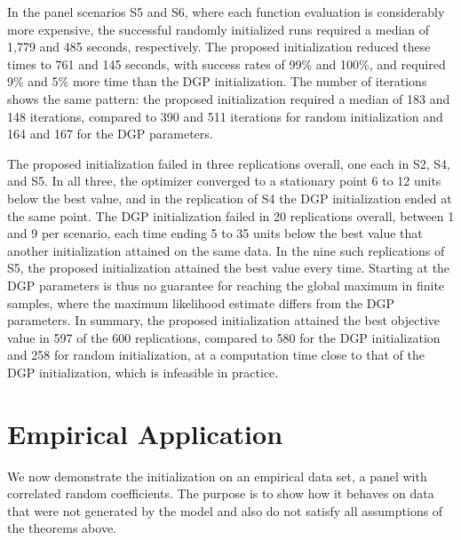 \documentclass[preprint,12pt,authoryear]{elsarticle}
\begin{document}
In the panel scenarios S5 and S6, where each function evaluation is considerably more expensive, the successful randomly initialized runs required a median of 1{,}779 and 485 seconds, respectively. The proposed initialization reduced these times to 761 and 145 seconds, with success rates of 99\% and 100\%, and required 9\% and 5\% more time than the DGP initialization. The number of iterations shows the same pattern: the proposed initialization required a median of 183 and 148 iterations, compared to 390 and 511 iterations for random initialization and 164 and 167 for the DGP parameters.

The proposed initialization failed in three replications overall, one each in S2, S4, and S5. In all three, the optimizer converged to a stationary point 6 to 12 units below the best value, and in the replication of S4 the DGP initialization ended at the same point. The DGP initialization failed in 20 replications overall, between 1 and 9 per scenario, each time ending 5 to 35 units below the best value that another initialization attained on the same data. In the nine such replications of S5, the proposed initialization attained the best value every time. Starting at the DGP parameters is thus no guarantee for reaching the global maximum in finite samples, where the maximum likelihood estimate differs from the DGP parameters. In summary, the proposed initialization attained the best objective value in 597 of the 600 replications, compared to 580 for the DGP initialization and 258 for random initialization, at a computation time close to that of the DGP initialization, which is infeasible in practice.

\section{Empirical Application}\label{sec:application}

We now demonstrate the initialization on an empirical data set, a panel with correlated random coefficients. The purpose is to show how it behaves on data that were not generated by the model and also do not satisfy all assumptions of the theorems above.

\begin{table}[htb]
    \centering
    \caption{Estimates $\hat{\theta}$ and proposed initial values $\theta^{(0)}$ in the empirical application. The parameters $O_1$ to $O_6$ are the free elements of the Cholesky root of the covariance matrix $\Omega$ of the random coefficients on price, operating cost, and acceleration time, the parameters $L_1$ and $L_2$ those of the error covariance matrix. HEV, PHEV, and BEV denote hybrid, plug-in hybrid, and battery electric powertrains, and the number after PHEV or BEV is the electric range in miles.}
    \label{tab:carsusest}
    \footnotesize
    \setlength{\tabcolsep}{3.5pt}
    \resizebox{\textwidth}{!}{}
\end{table}
\end{document}
